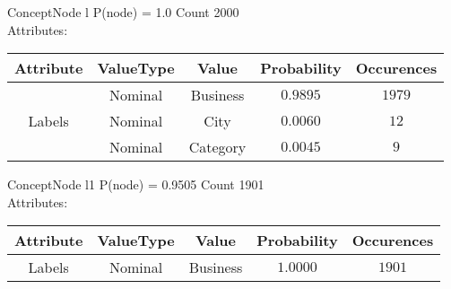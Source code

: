 
 
ConceptNode l \hspace{1cm} P(node) = 1.0 \hspace{1cm} Count 2000
\\ Attributes: \\ 
 \begin{table}[h] 
  \centering 
 \begin{longtable}{|c|c|c|c|c|} \hline 
Attribute & ValueType & Value & Probability & Occurences \\ \hline 
\multirow{3}{*}{Labels} & Nominal & Business & $0.9895$ & $1979$ \\ \cline{2-5} 
 & Nominal & City & $0.0060$ & $12$ \\ \cline{2-5} 
 & Nominal & Category & $0.0045$ & $9$ \\ \hline 
\end{longtable}
 \end{table} 


 
ConceptNode l1 \hspace{1cm} P(node) = 0.9505 \hspace{1cm} Count 1901
\\ Attributes: \\ 
 \begin{table}[h] 
  \centering 
 \begin{longtable}{|c|c|c|c|c|} \hline 
Attribute & ValueType & Value & Probability & Occurences \\ \hline 
\multirow{1}{*}{Labels} & Nominal & Business & $1.0000$ & $1901$ \\ \hline 
\end{longtable}
 \end{table} 

